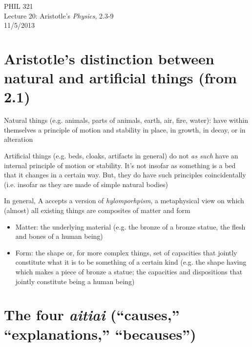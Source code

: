 \documentclass[11pt]{article}
\begin{document}
\thispagestyle{empty}
\begin{center} \LARGE{PHIL 321\\ Lecture 20: Aristotle's \emph{Physics}, 2.3-9}\\ \vspace*{2mm}
\large{11/5/2013}\end{center}
\thispagestyle{empty}\vspace*{3mm}
\vspace*{-8mm}

\section*{Aristotle's distinction between natural and artificial things (from 2.1)}

\noindent Natural things (e.g. animals, parts of animals, earth, air, fire, water): have within themselves a principle of motion and stability in place, in growth, in decay, or in alteration
\vspace*{2mm}

\noindent Artificial things (e.g. beds, cloaks, artifacts in general) do not \emph{as such} have an internal principle of motion or stability. It's not insofar as something is a bed that it changes in a certain way. But, they do have such principles coincidentally (i.e. insofar as they are made of simple natural bodies)
\vspace*{2mm}

\noindent In general, A accepts a version of \emph{hylomporhpism}, a metaphysical view on which (almost) all existing things are composites of matter and form
\begin{itemize}\item{Matter: the underlying material (e.g. the bronze of a bronze statue, the flesh and bones of a human being)}\item{Form: the shape or, for more complex things, set of capacities that jointly constitute what it is to be something of a certain kind (e.g. the shape having which makes a piece of bronze a statue; the capacities and dispositions that jointly constitute being a human being)}\end{itemize}

\section*{The four \emph{aitiai} (``causes,'' ``explanations,'' ``becauses'')}
\end{document}
